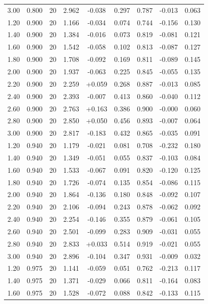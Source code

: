 \begin{longtable}{ccccccccc}
3.00 & 0.800 & 20 & 2.962 & -0.038 & 0.297 & 0.787 & -0.013 & 0.063 \\
1.20 & 0.900 & 20 & 1.166 & -0.034 & 0.074 & 0.744 & -0.156 & 0.130 \\
1.40 & 0.900 & 20 & 1.384 & -0.016 & 0.073 & 0.819 & -0.081 & 0.121 \\
1.60 & 0.900 & 20 & 1.542 & -0.058 & 0.102 & 0.813 & -0.087 & 0.127 \\
1.80 & 0.900 & 20 & 1.708 & -0.092 & 0.169 & 0.811 & -0.089 & 0.145 \\
2.00 & 0.900 & 20 & 1.937 & -0.063 & 0.225 & 0.845 & -0.055 & 0.135 \\
2.20 & 0.900 & 20 & 2.259 & +0.059 & 0.268 & 0.887 & -0.013 & 0.085 \\
2.40 & 0.900 & 20 & 2.393 & -0.007 & 0.413 & 0.860 & -0.040 & 0.112 \\
2.60 & 0.900 & 20 & 2.763 & +0.163 & 0.386 & 0.900 & -0.000 & 0.060 \\
2.80 & 0.900 & 20 & 2.850 & +0.050 & 0.456 & 0.893 & -0.007 & 0.064 \\
3.00 & 0.900 & 20 & 2.817 & -0.183 & 0.432 & 0.865 & -0.035 & 0.091 \\
1.20 & 0.940 & 20 & 1.179 & -0.021 & 0.081 & 0.708 & -0.232 & 0.180 \\
1.40 & 0.940 & 20 & 1.349 & -0.051 & 0.055 & 0.837 & -0.103 & 0.084 \\
1.60 & 0.940 & 20 & 1.533 & -0.067 & 0.091 & 0.820 & -0.120 & 0.125 \\
1.80 & 0.940 & 20 & 1.726 & -0.074 & 0.135 & 0.854 & -0.086 & 0.115 \\
2.00 & 0.940 & 20 & 1.864 & -0.136 & 0.180 & 0.848 & -0.092 & 0.107 \\
2.20 & 0.940 & 20 & 2.106 & -0.094 & 0.243 & 0.878 & -0.062 & 0.092 \\
2.40 & 0.940 & 20 & 2.254 & -0.146 & 0.355 & 0.879 & -0.061 & 0.105 \\
2.60 & 0.940 & 20 & 2.501 & -0.099 & 0.283 & 0.909 & -0.031 & 0.055 \\
2.80 & 0.940 & 20 & 2.833 & +0.033 & 0.514 & 0.919 & -0.021 & 0.055 \\
3.00 & 0.940 & 20 & 2.896 & -0.104 & 0.347 & 0.931 & -0.009 & 0.032 \\
1.20 & 0.975 & 20 & 1.141 & -0.059 & 0.051 & 0.762 & -0.213 & 0.117 \\
1.40 & 0.975 & 20 & 1.371 & -0.029 & 0.066 & 0.811 & -0.164 & 0.083 \\
1.60 & 0.975 & 20 & 1.528 & -0.072 & 0.088 & 0.842 & -0.133 & 0.115 \\

\end{longtable}
